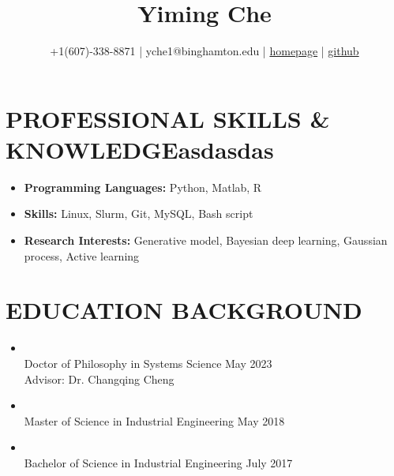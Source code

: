 \documentclass[10pt]{article}
\title{\bf  Yiming Che \vspace{-0.6em}}
\author{+1(607)-338-8871 | yche1@binghamton.edu | \href{https://soloche.github.io}{homepage} | \href{https://github.com/SoloChe}{github}}
\date{}
\begin{document}
	\maketitle

\vspace{-5em}

\section*{PROFESSIONAL SKILLS \& KNOWLEDGEasdasdas}
 \begin{itemize}	
 	\item {\bf Programming Languages:} Python, Matlab, R%
 	\item {\bf Skills:} Linux, Slurm, Git, MySQL, Bash script
 	\item {\bf Research Interests:} Generative model, Bayesian deep learning, Gaussian process, Active learning
 \end{itemize}

\section*{EDUCATION BACKGROUND}
\begin{itemize}
		\item {}                                                           
		\\Doctor of Philosophy in Systems Science \hfill May 2023 
		\\Advisor: Dr. Changqing Cheng

	\item {}                                                           
	\\Master of Science in Industrial Engineering \hfill  May 2018
	
    \item {}
            \\Bachelor of Science in Industrial Engineering \hfill July 2017 
\end{itemize}
\end{document}
